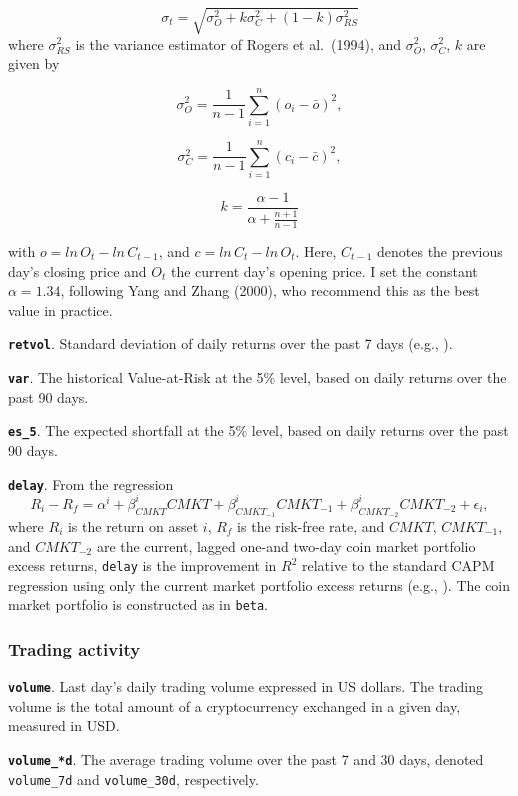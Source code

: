 \documentclass[
  12pt,
  a4paper,
  openany]{scrbook}
\begin{document}
\[
\sigma_t = \sqrt{\sigma^2_O + k\sigma^2_C + (1 - k)\sigma^2_{RS}}
\] where \(\sigma^2_{RS}\) is the variance estimator of Rogers et
al.~(1994), and \(\sigma^2_O\), \(\sigma^2_C\), \(k\) are given by

\[
\sigma^2_O = \frac{1}{n-1}\sum\limits_{i=1}^n(o_i - \bar o)^2,
\]

\[
\sigma^2_C = \frac{1}{n-1}\sum\limits_{i=1}^n(c_i - \bar c)^2,
\]

\[
k = \frac{\alpha -1}{\alpha + \frac{n+1}{n-1}}
\]

with \(o = ln\,O_t - ln\,C_{t-1}\), and \(c = ln\,C_t - ln\,O_t\). Here,
\(C_{t-1}\) denotes the previous day's closing price and \(O_t\) the
current day's opening price. I set the constant \(\alpha = 1.34\),
following Yang and Zhang (2000), who recommend this as the best value in
practice.

\textbf{\texttt{retvol}}. Standard deviation of daily returns over the
past 7 days (e.g., ).

\textbf{\texttt{var}}. The historical Value-at-Risk at the 5\% level,
based on daily returns over the past 90 days.

\textbf{\texttt{es\_5}}. The expected shortfall at the 5\% level, based
on daily returns over the past 90 days.

\textbf{\texttt{delay}}. From the regression \[
R_i - R_f = \alpha^i + \beta^i_{CMKT}CMKT + \beta^i_{CMKT_{-1}}CMKT_{-1} + \beta^i_{CMKT_{-2}}CMKT_{-2} + \epsilon_i, 
\] where \(R_i\) is the return on asset \(i\), \(R_f\) is the risk-free
rate, and \(CMKT\), \(CMKT_{-1}\), and \(CMKT_{-2}\) are the current,
lagged one-and two-day coin market portfolio excess returns,
\texttt{delay} is the improvement in \(R^2\) relative to the standard
CAPM regression using only the current market portfolio excess returns
(e.g., ).
The coin market portfolio is constructed as in \texttt{beta}.

\subsubsection{Trading activity}\label{trading-activity}

\textbf{\texttt{volume}}. Last day's daily trading volume expressed in
US dollars. The trading volume is the total amount of a cryptocurrency
exchanged in a given day, measured in USD.

\textbf{\texttt{volume\_*d}}. The average trading volume over the past 7
and 30 days, denoted \texttt{volume\_7d} and \texttt{volume\_30d},
respectively.
\end{document}
